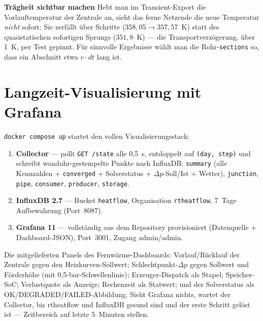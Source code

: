\documentclass[11pt,a4paper,parskip=half]{scrreprt}
\newcommand{\api}[1]{\texttt{#1}}
\newenvironment{beispiel}[1][Beispiel]
  {\par\medskip{\color{bsp}\hrule height 0.8pt}\nopagebreak\smallskip
   \noindent\textbf{\textsf{\textcolor{bsp}{#1}}}\quad\ignorespaces}
  {\par\nopagebreak\smallskip{\color{bsp}\hrule height 0.8pt}\par\medskip}
\begin{document}
\begin{beispiel}[Trägheit sichtbar machen]
Hebt man im Transient-Export die Vorlauftemperatur der Zentrale an, sieht das
ferne Netzende die neue Temperatur \emph{nicht} sofort: Sie zerfällt über
Schritte ($358{,}05\rightarrow357{,}57$~K) statt des quasistatischen sofortigen
Sprungs ($351{,}8$~K) --- die Transportverzögerung, über 1~K, per Test gepinnt.
Für sinnvolle Ergebnisse wählt man die Rohr-\texttt{sections} so, dass ein
Abschnitt etwa $v\cdot dt$ lang ist.
\end{beispiel}

\chapter{Langzeit-Visualisierung mit Grafana}
\label{ch:grafana}

\texttt{docker compose up} startet den vollen Visualisierungsstack:

\begin{enumerate}[nosep]
  \item \textbf{Collector} --- pollt \api{GET /state} alle 0{,}5~s, entdoppelt
    auf \texttt{(day, step)} und schreibt wanduhr-gestempelte Punkte nach
    InfluxDB: \texttt{summary} (alle Kennzahlen + \texttt{converged} +
    Solverstatus + $\Delta p$-Soll/Ist + Wetter), \texttt{junction},
    \texttt{pipe}, \texttt{consumer}, \texttt{producer}, \texttt{storage}.
  \item \textbf{InfluxDB 2.7} --- Bucket \texttt{heatflow}, Organisation
    \texttt{rtheatflow}, 7~Tage Aufbewahrung (Port~8087).
  \item \textbf{Grafana 11} --- vollständig aus dem Repository provisioniert
    (Datenquelle + Dashboard-JSON), Port~3001, Zugang admin/admin.
\end{enumerate}

Die mitgelieferten Panels des Fernwärme-Dashboards: Vorlauf/Rücklauf der
Zentrale gegen den Heizkurven-Sollwert; Schlechtpunkt-$\Delta p$ gegen Sollwert
und Förderhöhe (mit 0{,}5-bar-Schwellenlinie); Erzeuger-Dispatch als Stapel;
Speicher-SoC; Verlustquote als Anzeige; Rechenzeit als Statwert; und der
Solverstatus als OK/DEGRADED/FAILED-Abbildung. Sieht Grafana nichts, wartet der
Collector, bis rtheatflow und InfluxDB gesund sind und der erste Schritt gelöst
ist --- Zeitbereich auf \glqq letzte 5~Minuten\grqq{} stellen.

\end{document}
